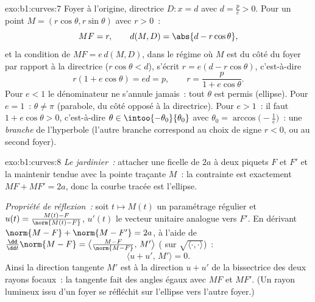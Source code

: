 \begin{solution}{exo:b1:curves:7}
Foyer à l'origine, directrice $D: x = d$ avec $d = \frac pe > 0$.
Pour un point $M = (r\cos\theta, r\sin\theta)$ avec $r > 0$~:
\[
MF = r,
\qquad
d(M, D) = \abs{d - r\cos\theta},
\]
et la condition de  $MF = e\,d(M, D)$, dans le régime où $M$
est du côté du foyer par rapport à la directrice ($r\cos\theta < d$), s'écrit $r
= e(d - r\cos\theta)$, c'est-à-dire
\[
r(1 + e\cos\theta) = ed = p,
\qquad
r = \frac{p}{1 + e\cos\theta} .
\]
Pour $e < 1$ le dénominateur ne s'annule jamais~: tout $\theta$ est permis
(ellipse). Pour $e = 1$~: $\theta \neq \pi$ (parabole,  du côté
opposé à la directrice). Pour $e > 1$~: il faut $1 + e\cos\theta > 0$,
c'est-à-dire $\theta \in \intoo{-\theta_0}{\theta_0}$ avec $\theta_0 =
\arccos\bigl(-\frac1e\bigr)$~: une \emph{branche} de l'hyperbole
(l'autre branche correspond au choix de signe $r < 0$, ou au
second foyer).
\end{solution}

\begin{solution}{exo:b1:curves:8}
\emph{Le jardinier~:} attacher une ficelle de  $2a$ à deux piquets $F$ et
$F'$ et la maintenir tendue avec la pointe traçante $M$~: la contrainte est
exactement $MF + MF' = 2a$, donc la courbe tracée est l'ellipse.

\emph{Propriété de réflexion~:} soit $t \mapsto M(t)$ un paramétrage
régulier et $u(t) = \frac{M(t) - F}{\norm{M(t) - F}}$,
$u'(t)$ le vecteur unitaire analogue vers $F'$. En dérivant
$\norm{M - F} + \norm{M - F'} = 2a$, à l'aide de $\frac{\dd}{\dd
t}\norm{M - F} = \bigl\langle \frac{M - F}{\norm{M-F}},\,
M'\bigr\rangle$ ( sur $\sqrt{\langle\cdot,\cdot\rangle}$)~:
\[
\bigl\langle u + u',\, M'\bigr\rangle = 0 .
\]
Ainsi la direction tangente $M'$ est  à la direction $u + u'$
de la bissectrice des deux rayons focaux~: la tangente fait des angles égaux
avec $MF$ et $MF'$. (Un rayon lumineux issu d'un foyer se réfléchit
sur l'ellipse vers l'autre foyer.)
\end{solution}

